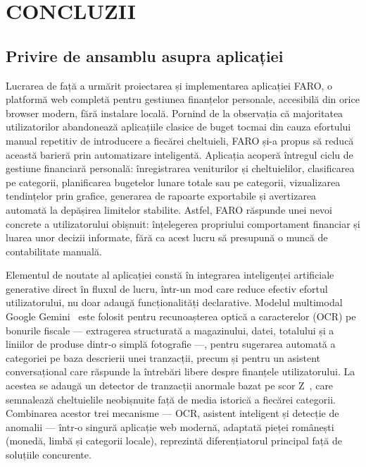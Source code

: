 \documentclass[12pt,a4paper,oneside]{report}
\begin{document}
\chapter{CONCLUZII}

\section{Privire de ansamblu asupra aplicației}

Lucrarea de față a urmărit proiectarea și implementarea aplicației FARO, o platformă web completă pentru gestiunea finanțelor personale, accesibilă din orice browser modern, fără instalare locală. Pornind de la observația că majoritatea utilizatorilor abandonează aplicațiile clasice de buget tocmai din cauza efortului manual repetitiv de introducere a fiecărei cheltuieli, FARO și-a propus să reducă această barieră prin automatizare inteligentă. Aplicația acoperă întregul ciclu de gestiune financiară personală: înregistrarea veniturilor și cheltuielilor, clasificarea pe categorii, planificarea bugetelor lunare totale sau pe categorii, vizualizarea tendințelor prin grafice, generarea de rapoarte exportabile și avertizarea automată la depășirea limitelor stabilite. Astfel, FARO răspunde unei nevoi concrete a utilizatorului obișnuit: înțelegerea propriului comportament financiar și luarea unor decizii informate, fără ca acest lucru să presupună o muncă de contabilitate manuală.

Elementul de noutate al aplicației constă în integrarea inteligenței artificiale generative direct în fluxul de lucru, într-un mod care reduce efectiv efortul utilizatorului, nu doar adaugă funcționalități declarative. Modelul multimodal Google Gemini~\cite{ref:gemini} este folosit pentru recunoașterea optică a caracterelor (OCR) pe bonurile fiscale --- extragerea structurată a magazinului, datei, totalului și a liniilor de produse dintr-o simplă fotografie ---, pentru sugerarea automată a categoriei pe baza descrierii unei tranzacții, precum și pentru un asistent conversațional care răspunde la întrebări libere despre finanțele utilizatorului. La acestea se adaugă un detector de tranzacții anormale bazat pe scor Z~\cite{ref:zscore}, care semnalează cheltuielile neobișnuite față de media istorică a fiecărei categorii. Combinarea acestor trei mecanisme --- OCR, asistent inteligent și detecție de anomalii --- într-o singură aplicație web modernă, adaptată pieței românești (monedă, limbă și categorii locale), reprezintă diferențiatorul principal față de soluțiile concurente.
\end{document}
